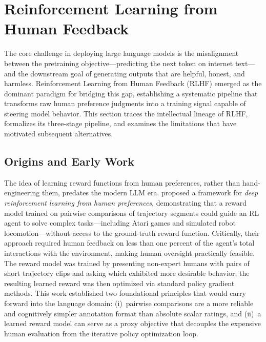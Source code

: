 \section{Reinforcement Learning from Human Feedback}
\label{sec:rlhf}

The core challenge in deploying large language models is the misalignment between the pretraining objective---predicting the next token on internet text---and the downstream goal of generating outputs that are helpful, honest, and harmless. Reinforcement Learning from Human Feedback (RLHF) emerged as the dominant paradigm for bridging this gap, establishing a systematic pipeline that transforms raw human preference judgments into a training signal capable of steering model behavior. This section traces the intellectual lineage of RLHF, formalizes its three-stage pipeline, and examines the limitations that have motivated subsequent alternatives.

\subsection{Origins and Early Work}

The idea of learning reward functions from human preferences, rather than hand-engineering them, predates the modern LLM era. \cite{christiano2017deep} proposed a framework for \emph{deep reinforcement learning from human preferences}, demonstrating that a reward model trained on pairwise comparisons of trajectory segments could guide an RL agent to solve complex tasks---including Atari games and simulated robot locomotion---without access to the ground-truth reward function. Critically, their approach required human feedback on less than one percent of the agent's total interactions with the environment, making human oversight practically feasible. The reward model was trained by presenting non-expert humans with pairs of short trajectory clips and asking which exhibited more desirable behavior; the resulting learned reward was then optimized via standard policy gradient methods. This work established two foundational principles that would carry forward into the language domain: (i)~pairwise comparisons are a more reliable and cognitively simpler annotation format than absolute scalar ratings, and (ii)~a learned reward model can serve as a proxy objective that decouples the expensive human evaluation from the iterative policy optimization loop.

